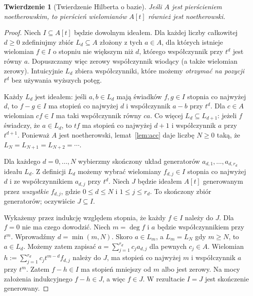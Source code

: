 \documentclass[11pt,a4paper,openany]{report}
\numberwithin{equation}{section}
\theoremstyle{plain}
\newtheorem{twierdzenie}{Twierdzenie}[section]
\theoremstyle{definition}
\theoremstyle{remark}
\begin{document}
\begin{twierdzenie}[Twierdzenie Hilberta o bazie]
\label{tw:hilbert-basis}
Jeśli $A$ jest pierścieniem noetherowskim, to pierścień wielomianów
$A[t]$ również jest noetherowski.
\end{twierdzenie}
\begin{proof}
Niech $I\subseteq A[t]$ będzie dowolnym ideałem.
Dla każdej liczby całkowitej $d\ge0$ zdefiniujmy zbiór
$L_d\subseteq A$ złożony z tych $a\in A$, dla których istnieje
wielomian $f\in I$ o stopniu nie większym niż $d$,
którego współczynnik przy $t^d$ jest równy $a$.
Dopuszczamy więc zerowy współczynnik wiodący (a także wielomian
zerowy). Intuicyjnie $L_d$ zbiera współczynniki, które możemy
\emph{otrzymać na pozycji $t^d$} bez używania wyższych potęg.

Każdy $L_d$ jest ideałem: jeśli $a,b\in L_d$ mają świadków
$f,g\in I$ stopnia co najwyżej $d$, to $f-g\in I$ ma stopień
co najwyżej $d$ i współczynnik $a-b$ przy $t^d$.
Dla $c\in A$ wielomian $cf\in I$ ma taki współczynnik równy $ca$.
Co więcej $L_d\subseteq L_{d+1}$: jeżeli $f$ świadczy, że
$a\in L_d$, to $tf$ ma stopień co najwyżej $d+1$ i współczynnik
$a$ przy $t^{d+1}$. Ponieważ $A$ jest noetherowski,
lemat~\ref{lem:acc} daje liczbę $N\ge0$ taką, że
$L_N=L_{N+1}=L_{N+2}=\cdots$.

Dla każdego $d=0,\dots,N$ wybierzmy skończony układ generatorów
$a_{d,1},\dots,a_{d,r_d}$ ideału $L_d$. Z definicji $L_d$
możemy wybrać wielomiany $f_{d,j}\in I$ stopnia co najwyżej $d$
i ze współczynnikiem $a_{d,j}$ przy $t^d$.
Niech $J$ będzie ideałem $A[t]$ generowanym przez \emph{wszystkie}
$f_{d,j}$, gdzie $0\le d\le N$ i $1\le j\le r_d$.
To skończony zbiór generatorów; oczywiście $J\subseteq I$.

Wykażemy przez indukcję względem stopnia, że każdy $f\in I$
należy do $J$. Dla $f=0$ nie ma czego dowodzić.
Niech $m=\deg f$ i $a$ będzie współczynnikiem przy $t^m$.
Wprowadźmy $d=\min(m,N)$.
Skoro $a\in L_m$, a $L_m=L_N$ gdy $m\ge N$,
to $a\in L_d$. Możemy zatem zapisać
$a=\sum_{j=1}^{r_d}c_ja_{d,j}$ dla pewnych $c_j\in A$.
Wielomian
$h:=\sum_{j=1}^{r_d}c_jt^{m-d}f_{d,j}$ należy do $J$,
ma stopień co najwyżej $m$ i współczynnik $a$ przy $t^m$.
Zatem $f-h\in I$ ma stopień mniejszy od $m$ albo jest zerowy.
Na mocy założenia indukcyjnego $f-h\in J$, a więc $f\in J$.
W rezultacie $I=J$ jest skończenie generowany.
\end{proof}
\end{document}
